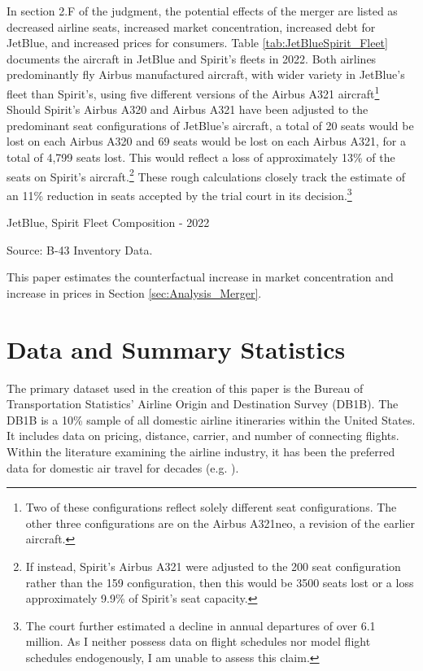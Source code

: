 \documentclass{article}
\begin{document}
	In section 2.F of the judgment, the potential effects of the merger are listed as decreased airline seats, increased market concentration, increased debt for JetBlue, and increased prices for consumers. Table \ref{tab:JetBlueSpirit_Fleet} documents the aircraft in JetBlue and Spirit's fleets in 2022. Both airlines predominantly fly Airbus manufactured aircraft, with wider variety in JetBlue's fleet than Spirit's, using five different versions of the Airbus A321 aircraft\footnote{Two of these configurations reflect solely different seat configurations. The other three configurations are on the Airbus A321neo, a revision of the earlier aircraft.} Should Spirit's Airbus A320 and Airbus A321 have been adjusted to the predominant seat configurations of JetBlue's aircraft, a total of 20 seats would be lost on each Airbus A320 and 69 seats would be lost on each Airbus A321, for a total of 4,799 seats lost. This would reflect a loss of approximately 13\% of the seats on Spirit's aircraft.\footnote{If instead, Spirit's Airbus A321 were adjusted to the 200 seat configuration rather than the 159 configuration, then this would be 3500 seats lost or a loss approximately 9.9\% of Spirit's seat capacity.} These rough calculations closely track the estimate of an 11\% reduction in seats accepted by the trial court in its decision.\footnote{The court further estimated a decline in annual departures of over 6.1 million. As I neither possess data on flight schedules nor model flight schedules endogenously, I am unable to assess this claim.} 
    
    \begin{table}
        \begin{center}
            \caption{JetBlue, Spirit Fleet Composition - 2022}
            \label{tab:JetBlueSpirit_Fleet}
            \vspace{-10mm}
          
        \end{center}
        \footnotesize{Source: B-43 Inventory Data.}
    \end{table}

    This paper estimates the counterfactual increase in market concentration and increase in prices in Section \ref{sec:Analysis_Merger}. 

	\section{Data and Summary Statistics}
	\label{sec:Data}
	The primary dataset used in the creation of this paper is the Bureau of Transportation Statistics' Airline Origin and Destination Survey (DB1B). The DB1B is a 10\% sample of all domestic airline itineraries within the United States. It includes data on pricing, distance, carrier, and number of connecting flights. Within the literature examining the airline industry, it has been the preferred data for domestic air travel for decades (e.g. \citet{ciliberto_market_2021, berry_tracing_2010, goolsbee_how_2008, peters_evaluating_2006}). 
\end{document}

